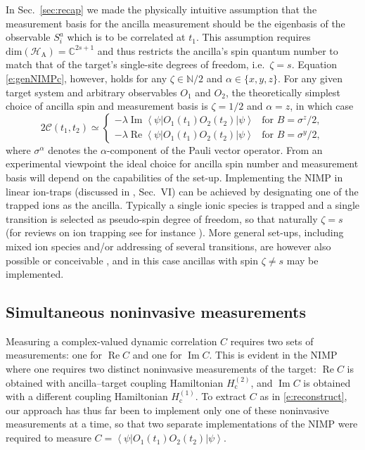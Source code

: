 \documentclass[epjST,numbook]{svjour}
\newcommand\NN{{\mathds{N}}}
\newcommand\CC{{\mathds{C}}}
\newcommand{\wmcf}{\mathscr{C}}
\newcommand{\matel}[3]{ \displaystyle \left\langle #1 \right \vert #2 \left\vert  #3 \right\rangle }
\DeclareMathOperator{\imp }{\mathrm{Im}}
\DeclareMathOperator{\rep}{\mathrm{Re}}
\begin{document}
In Sec.~\ref{sec:recap} we made the physically intuitive assumption that the measurement basis for the ancilla measurement should be the eigenbasis of the observable $S_i^a$ which is to be correlated at $t_1$. This assumption requires $\text{dim}(\mathscr{H}_\text{A})=\CC^{2s+1}$ and thus restricts the ancilla's spin quantum number to match that of the target's single-site degrees of freedom, i.e.\ ${\zeta=s}$. Equation \eqref{e:genNIMPc}, however, holds for any $\zeta \in \NN/2$ and ${\alpha \in \{x,y,z\}}$. For any given target system and arbitrary observables $O_1$ and $O_2$, the theoretically simplest choice of ancilla spin and measurement basis is $\zeta=1/2$ and $\alpha=z$, in which case
\begin{equation}\label{e:genEG}
2\wmcf(t_1,t_2) \simeq 
\begin{cases}
-\lambda \imp{\matel{\psi}{ O_1(t_1) O_2(t_2) }{\psi}} & \text{for $B=\sigma^z/2$}, \\
-\lambda \rep{\matel{\psi}{ O_1(t_1) O_2(t_2) }{\psi}} & \text{for $B=\sigma^y/2$},
\end{cases}
\end{equation}
where $\sigma^\alpha$ denotes the $\alpha$-component of the Pauli vector operator.
From an experimental viewpoint the ideal choice for ancilla spin number and measurement basis will depend on the capabilities of the set-up. Implementing the NIMP in linear ion-traps (discussed in \cite{Uhrich_etal}, Sec.~VI) can be achieved by designating one of the trapped ions as the ancilla. Typically a single ionic species is trapped and a single transition is selected as pseudo-spin degree of freedom, so that naturally $\zeta=s$ (for reviews on ion trapping see for instance \cite{Steane1997,Ozeri2011,James97}). More general set-ups, including mixed ion species and/or addressing of several transitions, are however also possible or conceivable \cite{Home2013,Wright2016}, and in this case ancillas with spin $\zeta\neq s$ may be implemented.



\subsection{Simultaneous noninvasive measurements}
\label{sec:simCouple}
Measuring a complex-valued dynamic correlation $C$ requires two sets of measurements: one for $\rep C$ and one for $\imp C$. This is evident in the NIMP where one requires two distinct noninvasive measurements of the target: $\rep C$ is obtained with ancilla--target coupling Hamiltonian $H^{(2)}_\text{c}$, and $\imp C$ is obtained with a different coupling Hamiltonian $H^{(1)}_\text{c}$. To extract $C$ as in \eqref{e:reconstruct}, our approach has thus far been to implement only one of these noninvasive measurements at a time, so that two separate implementations of the NIMP were required to measure $C=\matel{\psi}{ O_1(t_1) O_2(t_2) }{\psi}$.
\end{document}

